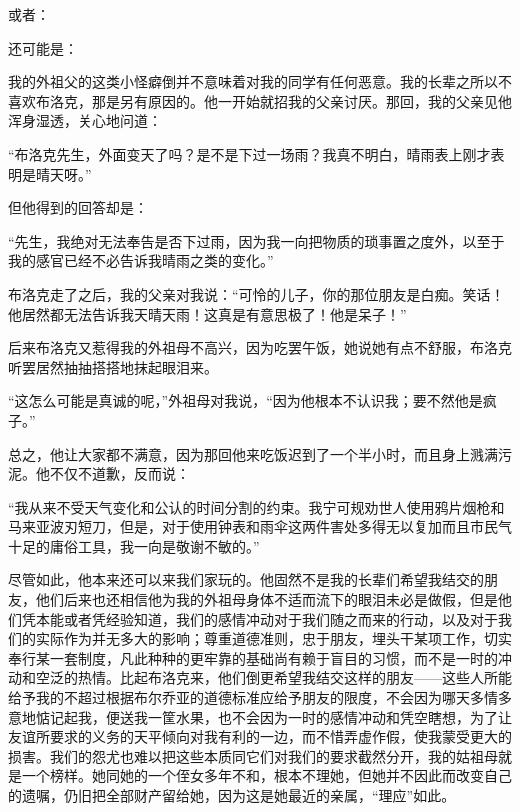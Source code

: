 \par 或者：
\par 还可能是：
\par 我的外祖父的这类小怪癖倒并不意味着对我的同学有任何恶意。我的长辈之所以不喜欢布洛克，那是另有原因的。他一开始就招我的父亲讨厌。那回，我的父亲见他浑身湿透，关心地问道：
\par “布洛克先生，外面变天了吗？是不是下过一场雨？我真不明白，晴雨表上刚才表明是晴天呀。”
\par 但他得到的回答却是：
\par “先生，我绝对无法奉告是否下过雨，因为我一向把物质的琐事置之度外，以至于我的感官已经不必告诉我晴雨之类的变化。”
\par 布洛克走了之后，我的父亲对我说：“可怜的儿子，你的那位朋友是白痴。笑话！他居然都无法告诉我天晴天雨！这真是有意思极了！他是呆子！”
\par 后来布洛克又惹得我的外祖母不高兴，因为吃罢午饭，她说她有点不舒服，布洛克听罢居然抽抽搭搭地抹起眼泪来。
\par “这怎么可能是真诚的呢，”外祖母对我说，“因为他根本不认识我；要不然他是疯子。”
\par 总之，他让大家都不满意，因为那回他来吃饭迟到了一个半小时，而且身上溅满污泥。他不仅不道歉，反而说：
\par “我从来不受天气变化和公认的时间分割的约束。我宁可规劝世人使用鸦片烟枪和马来亚波刃短刀，但是，对于使用钟表和雨伞这两件害处多得无以复加而且市民气十足的庸俗工具，我一向是敬谢不敏的。”
\par 尽管如此，他本来还可以来我们家玩的。他固然不是我的长辈们希望我结交的朋友，他们后来也还相信他为我的外祖母身体不适而流下的眼泪未必是做假，但是他们凭本能或者凭经验知道，我们的感情冲动对于我们随之而来的行动，以及对于我们的实际作为并无多大的影响；尊重道德准则，忠于朋友，埋头干某项工作，切实奉行某一套制度，凡此种种的更牢靠的基础尚有赖于盲目的习惯，而不是一时的冲动和空泛的热情。比起布洛克来，他们倒更希望我结交这样的朋友——这些人所能给予我的不超过根据布尔乔亚的道德标准应给予朋友的限度，不会因为哪天多情多意地惦记起我，便送我一筐水果，也不会因为一时的感情冲动和凭空瞎想，为了让友谊所要求的义务的天平倾向对我有利的一边，而不惜弄虚作假，使我蒙受更大的损害。我们的怨尤也难以把这些本质同它们对我们的要求截然分开，我的姑祖母就是一个榜样。她同她的一个侄女多年不和，根本不理她，但她并不因此而改变自己的遗嘱，仍旧把全部财产留给她，因为这是她最近的亲属，“理应”如此。

